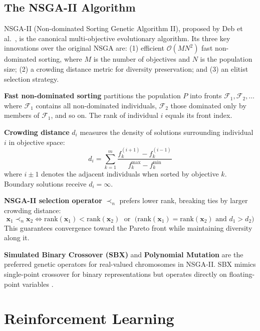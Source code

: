 \subsection{The NSGA-II Algorithm}

NSGA-II (Non-dominated Sorting Genetic Algorithm II), proposed by Deb et al.\ \cite{deb2002fast}, is the canonical multi-objective evolutionary algorithm. Its three key innovations over the original NSGA are: (1) efficient $\mathcal{O}(MN^2)$ fast non-dominated sorting, where $M$ is the number of objectives and $N$ is the population size; (2) a crowding distance metric for diversity preservation; and (3) an elitist selection strategy.

\textbf{Fast non-dominated sorting} partitions the population $P$ into fronts $\mathcal{F}_1, \mathcal{F}_2, \ldots$ where $\mathcal{F}_1$ contains all non-dominated individuals, $\mathcal{F}_2$ those dominated only by members of $\mathcal{F}_1$, and so on. The rank of individual $i$ equals its front index.

\textbf{Crowding distance} $d_i$ measures the density of solutions surrounding individual $i$ in objective space:
\begin{equation}
d_i = \sum_{k=1}^{m} \frac{f_k^{(i+1)} - f_k^{(i-1)}}{f_k^{\max} - f_k^{\min}}
\label{eq:crowding_distance}
\end{equation}
where $i \pm 1$ denotes the adjacent individuals when sorted by objective $k$. Boundary solutions receive $d_i = \infty$.

\textbf{NSGA-II selection operator} $\prec_n$ prefers lower rank, breaking ties by larger crowding distance:
\begin{equation}
\mathbf{x}_1 \prec_n \mathbf{x}_2 \iff \text{rank}(\mathbf{x}_1) < \text{rank}(\mathbf{x}_2) \;\text{ or }\; \bigl(\text{rank}(\mathbf{x}_1) = \text{rank}(\mathbf{x}_2) \text{ and } d_1 > d_2\bigr)
\end{equation}
This guarantees convergence toward the Pareto front while maintaining diversity along it.

\textbf{Simulated Binary Crossover (SBX)} and \textbf{Polynomial Mutation} are the preferred genetic operators for real-valued chromosomes in NSGA-II. SBX mimics single-point crossover for binary representations but operates directly on floating-point variables \cite{deb2002fast}.

\section{Reinforcement Learning}


